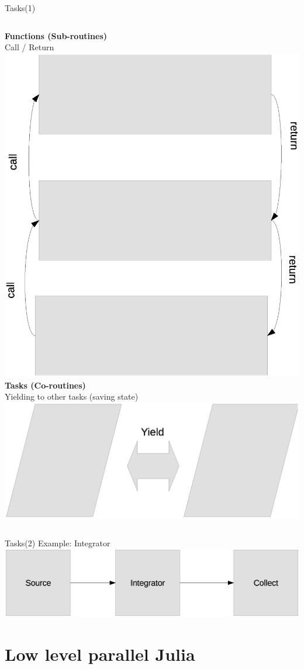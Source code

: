 \documentclass{beamer}
\begin{document}
	\begin{frame}{Tasks(1)}
		\begin{columns}[c]
				\textbf{Functions (Sub-routines)} \\
				Call / Return
				\includegraphics[width = .6\textwidth]{figures/functions.eps}
				\textbf{Tasks (Co-routines)} \\
				Yielding to other tasks (saving state) \\
				\includegraphics[width = .6\textwidth]{figures/tasks.eps}
		\end{columns}
	\end{frame}

	\begin{frame}{Tasks(2)}
		Example: Integrator \\
		\includegraphics[width=.6\textwidth]{figures/integrator.eps}
	\end{frame}	

	\section{Low level parallel Julia}
\end{document}
